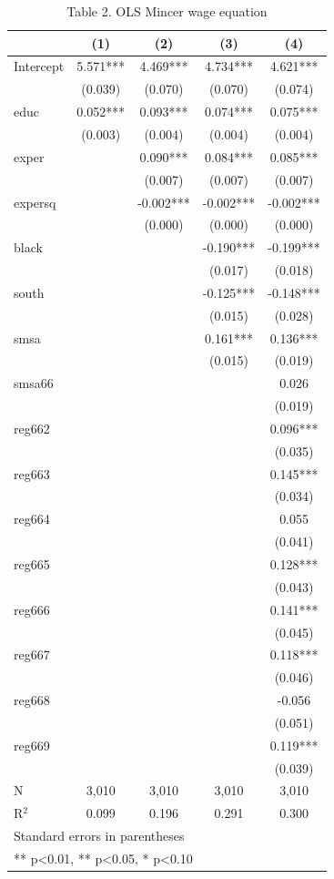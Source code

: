 \begin{table}[htbp]
\centering
\caption{Table 2. OLS Mincer wage equation}
\begin{tabular}{lcccc}
\hline\hline
 & (1) & (2) & (3) & (4) \\
\hline
Intercept & 5.571*** & 4.469*** & 4.734*** & 4.621*** \\
 & (0.039) & (0.070) & (0.070) & (0.074) \\
educ & 0.052*** & 0.093*** & 0.074*** & 0.075*** \\
 & (0.003) & (0.004) & (0.004) & (0.004) \\
exper &  & 0.090*** & 0.084*** & 0.085*** \\
 &  & (0.007) & (0.007) & (0.007) \\
expersq &  & -0.002*** & -0.002*** & -0.002*** \\
 &  & (0.000) & (0.000) & (0.000) \\
black &  &  & -0.190*** & -0.199*** \\
 &  &  & (0.017) & (0.018) \\
south &  &  & -0.125*** & -0.148*** \\
 &  &  & (0.015) & (0.028) \\
smsa &  &  & 0.161*** & 0.136*** \\
 &  &  & (0.015) & (0.019) \\
smsa66 &  &  &  & 0.026 \\
 &  &  &  & (0.019) \\
reg662 &  &  &  & 0.096*** \\
 &  &  &  & (0.035) \\
reg663 &  &  &  & 0.145*** \\
 &  &  &  & (0.034) \\
reg664 &  &  &  & 0.055 \\
 &  &  &  & (0.041) \\
reg665 &  &  &  & 0.128*** \\
 &  &  &  & (0.043) \\
reg666 &  &  &  & 0.141*** \\
 &  &  &  & (0.045) \\
reg667 &  &  &  & 0.118*** \\
 &  &  &  & (0.046) \\
reg668 &  &  &  & -0.056 \\
 &  &  &  & (0.051) \\
reg669 &  &  &  & 0.119*** \\
 &  &  &  & (0.039) \\
\hline
N & 3,010 & 3,010 & 3,010 & 3,010 \\
R$^2$ & 0.099 & 0.196 & 0.291 & 0.300 \\
\hline\hline
\multicolumn{5}{l}{\footnotesize Standard errors in parentheses} \\
\multicolumn{5}{l}{\footnotesize *** p<0.01, ** p<0.05, * p<0.10} \\
\end{tabular}
\end{table}

